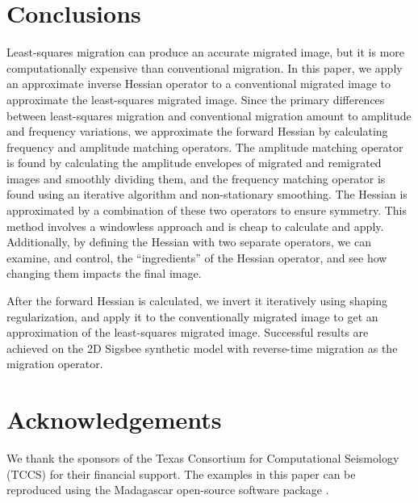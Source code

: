 \section{Conclusions}
Least-squares migration can produce an accurate migrated image, but it is more computationally expensive than conventional migration.
In this paper, we apply an approximate inverse Hessian operator to a conventional migrated image to approximate the least-squares migrated image.
Since the primary differences between least-squares migration and conventional migration amount to amplitude and frequency variations, we approximate the forward Hessian by calculating frequency and amplitude matching operators.
The amplitude matching operator is found by calculating the amplitude envelopes of migrated and remigrated images and smoothly dividing them, and the frequency matching operator is found using an iterative algorithm and non-stationary smoothing.
The Hessian is approximated by a combination of these two operators to ensure symmetry.
This method involves a windowless approach and is cheap to calculate and apply.
Additionally, by defining the Hessian with two separate operators, we can examine, and control, the ``ingredients'' of the Hessian operator, and see how changing them impacts the final image.

After the forward Hessian is calculated, we invert it iteratively using shaping regularization, and apply it to the conventionally migrated image to get an approximation of the least-squares migrated image.
Successful results are achieved on the 2D Sigsbee synthetic model with reverse-time migration as the migration operator.



\section{Acknowledgements}
        We thank the sponsors of the Texas Consortium for Computational Seismology (TCCS) for their financial support.
The examples in this paper can be reproduced using the Madagascar open-source software package \cite[]{madagascar}.

